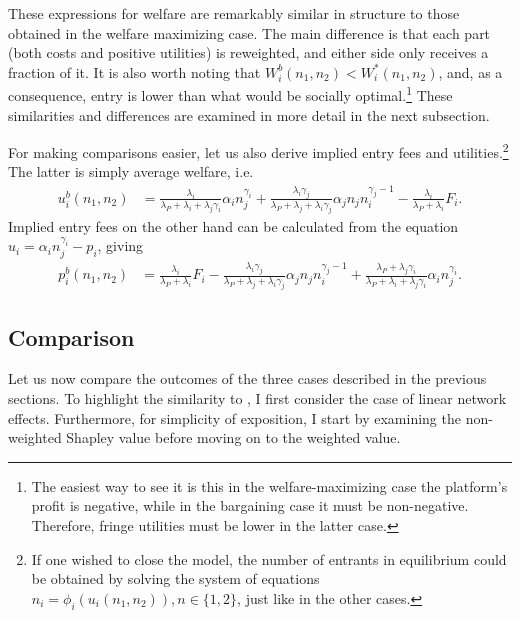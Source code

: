 \documentclass[a4paper]{article}
\begin{document}
These expressions for welfare are remarkably similar in structure to those obtained in the welfare maximizing case.
The main difference is that each part (both costs and positive utilities) is reweighted, and either side only receives a fraction of it.
It is also worth noting that $W_i^b(n_1, n_2) < W_i^*(n_1, n_2)$, and, as a consequence, entry is lower than what would be socially optimal.\footnote{
    The easiest way to see it is this in the welfare-maximizing case the platform's profit is negative, while in the bargaining case it must be non-negative.
    Therefore, fringe utilities must be lower in the latter case.
}
These similarities and differences are examined in more detail in the next subsection.

For making comparisons easier, let us also derive implied entry fees and utilities.\footnote{
    If one wished to close the model, the number of entrants in equilibrium could be obtained by solving the system of equations $n_i = \phi_i(u_i(n_1, n_2)), n \in \{1, 2\}$, just like in the other cases.
}
The latter is simply average welfare, i.e.
\begin{align*}
    u_i^b(n_1, n_2) &= \frac{\lambda_i}{\lambda_P + \lambda_i + \lambda_j\gamma_i} \alpha_i n_j^{\gamma_i} + \frac{\lambda_i \gamma_j}{\lambda_P + \lambda_j + \lambda_i\gamma_j} \alpha_j n_j n_i^{\gamma_j - 1} - \frac{\lambda_i}{\lambda_P + \lambda_i} F_i.
\end{align*}
Implied entry fees on the other hand can be calculated from the equation $u_i = \alpha_i n_j^{\gamma_i} - p_i$, giving
\begin{align}
    p_i^b(n_1, n_2) &= \frac{\lambda_i}{\lambda_P + \lambda_i} F_i - \frac{\lambda_i \gamma_j}{\lambda_P + \lambda_j + \lambda_i\gamma_j} \alpha_j n_j n_i^{\gamma_j - 1} + \frac{\lambda_P + \lambda_j\gamma_i}{\lambda_P + \lambda_i + \lambda_j\gamma_i} \alpha_i n_j^{\gamma_i}.  \label{eq:bargaining_entry_fees}
\end{align}

\subsection{Comparison}

Let us now compare the outcomes of the three cases described in the previous sections.
To highlight the similarity to \textcite{armstrong2006competition}, I first consider the case of linear network effects.
Furthermore, for simplicity of exposition, I start by examining the non-weighted Shapley value before moving on to the weighted value.
\end{document}
